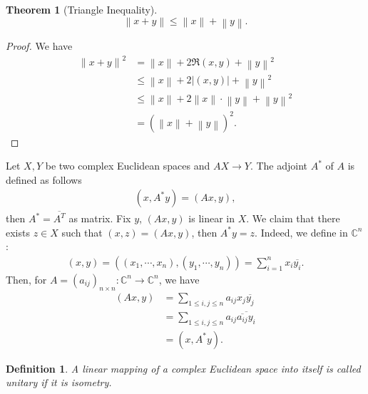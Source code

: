 \documentclass[11pt]{book}
\newtheorem{definition}{Definition}[chapter]
\newtheorem{theorem}{Theorem}[chapter]
\theoremstyle{definition}
\numberwithin{equation}{chapter}
\begin{document}
\medskip

\begin{theorem}[Triangle Inequality]
$$\left\|x+y\right\| \leq \left\|x\right\| + \left\|y\right\|.$$
\end{theorem}
\begin{proof}
We have
\begin{align*}
    \left\|x+y\right\|^2 & = \left\|x\right\| + 2 \Re(x,y) + \left\|y\right\|^2 \\
    & \leq \left\|x\right\| + 2\left|(x,y)\right| + \left\|y\right\|^2 \\
    & \leq \left\|x\right\| + 2 \left\|x\right\| \cdot \left\|y\right\| + \left\|y\right\|^2 \\
    & = (\left\|x\right\| + \left\|y\right\|)^2.
\end{align*}
\end{proof}

\medskip

Let $X, Y$ be two complex Euclidean spaces and $AX\to Y$. The adjoint $A^*$ of $A$ is defined as follows 
\begin{align*}
    (x, A^* y) = (Ax, y),
\end{align*}
then $A^* = \overline{A^T}$ as matrix. Fix $y$, $(Ax, y)$ is linear in $X$. We claim that there exists $z\in X$ such that $(x,z) = (Ax, y)$, then $A^* y = z$. Indeed, we define in $\mathbb{C}^n$:
\begin{align*}
    (x,y) = \left((x_1,\cdots,x_n), (y_1,\cdots,y_n)\right) = \sum^n_{i=1}x_i \overline{y_i}.
\end{align*}
Then, for $A = (a_{ij})_{n\times n}:\mathbb{C}^n \to \mathbb{C}^n$, we have
\begin{align*}
    (Ax, y) & = \sum_{1\leq i,j\leq n}a_{ij} x_j \overline{y_j} \\
    & = \sum_{1\leq i,j\leq n}a_{ij} \overline{\overline{a_{ij}} y_i} \\
    & = (x, A^* y).
\end{align*}

\medskip

\begin{definition}
A linear mapping of a complex Euclidean space into itself is called unitary if it is isometry.
\end{definition}

\medskip
\end{document}
